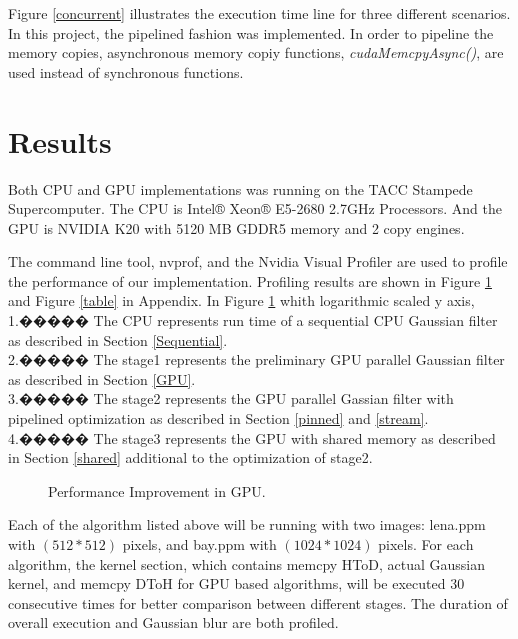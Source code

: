 \documentclass[journal,11pt,onecolumn,draftclsnofoot]{ieeeconf}  %
\begin{document}
Figure \ref{concurrent} illustrates the execution time line for three different scenarios. In this project, the pipelined fashion was implemented. In order to pipeline the memory copies, asynchronous memory copiy functions, \textit{cudaMemcpyAsync()}, are used instead of synchronous functions.\cite{Stream} \par

\section{Results}
Both CPU and GPU implementations was running on the TACC Stampede Supercomputer. The CPU is Intel® Xeon® E5-2680 2.7GHz Processors. And the GPU is NVIDIA K20 with 5120 MB GDDR5 memory and 2 copy engines. \par
The command line tool, nvprof, and the Nvidia Visual Profiler are used to profile the performance of our implementation. Profiling results are shown in Figure \ref{performances} and Figure \ref{table} in Appendix. In Figure \ref{performances} whith logarithmic scaled y axis,\\ 
1.�����	The CPU represents run time of a sequential CPU Gaussian filter as described in Section \ref{Sequential}.\\
2.�����	The stage1 represents the preliminary GPU parallel Gaussian filter as described in Section \ref{GPU}.\\
3.�����	The stage2 represents the GPU parallel Gassian filter with pipelined optimization as described in Section \ref{pinned} and \ref{stream}.\\
4.�����	The stage3 represents the GPU with shared memory as described in Section \ref{shared} additional to the optimization of stage2.\\

\begin{figure}[h]
		\vspace*{-5mm}
	\caption{Performance Improvement in GPU.}
	\label{performances}
	\vspace*{-5mm}
\end{figure}
Each of the algorithm listed above will be running with two images: lena.ppm with $(512*512)$ pixels, and bay.ppm with $(1024*1024)$ pixels. For each algorithm, the kernel section, which contains memcpy HToD, actual Gaussian kernel, and memcpy DToH for GPU based algorithms, will be executed 30 consecutive times for better comparison between different stages. The duration of overall execution and Gaussian blur are both profiled. \par
\end{document}
